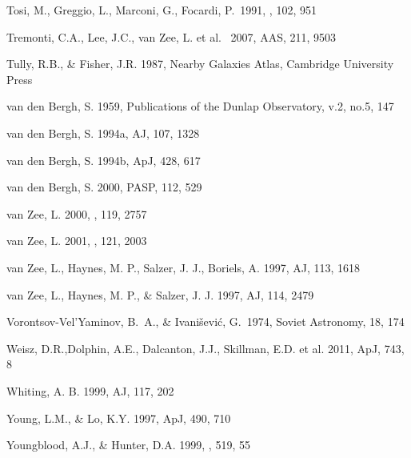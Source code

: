 \documentclass[12pt,preprint]{emulateapj}
\begin{document}
\begin{thebibliography}{}
Tosi, M., Greggio, L., Marconi, G., Focardi, P.\ 1991, \aj, 102, 951 

Tremonti, C.A., Lee, J.C., van Zee, L. et al. \ 2007, AAS, 211, 9503

Tully, R.B., \& Fisher, J.R. 1987, Nearby Galaxies Atlas, Cambridge
University Press
 
van den Bergh, S. 1959, Publications of the Dunlap Observatory, v.2, no.5, 147

van den Bergh, S. 1994a, AJ, 107, 1328

van den Bergh, S. 1994b, ApJ, 428, 617

van den Bergh, S. 2000, PASP, 112, 529

van Zee, L. 2000, \aj , 119, 2757

van Zee, L. 2001, \aj , 121, 2003

van Zee, L., Haynes, M. P., Salzer, J. J., Boriels, A. 1997, AJ, 113, 1618

van Zee, L., Haynes, M. P., \& Salzer, J. J. 1997, AJ, 114, 2479

Vorontsov-Vel'Yaminov, B.~A., \& 
Ivani{\v s}evi{\'c}, G.\ 1974, Soviet Astronomy, 18, 174 

Weisz, D.R.,Dolphin, A.E., Dalcanton, J.J., Skillman, E.D. et al. 2011, ApJ, 743, 8

Whiting, A. B. 1999, AJ, 117, 202

Young, L.M., \& Lo, K.Y. 1997, ApJ, 490, 710
 
Youngblood, A.J., \& Hunter, D.A. 1999, \apj , 519, 55

\end{thebibliography}

\clearpage

\end{document}
